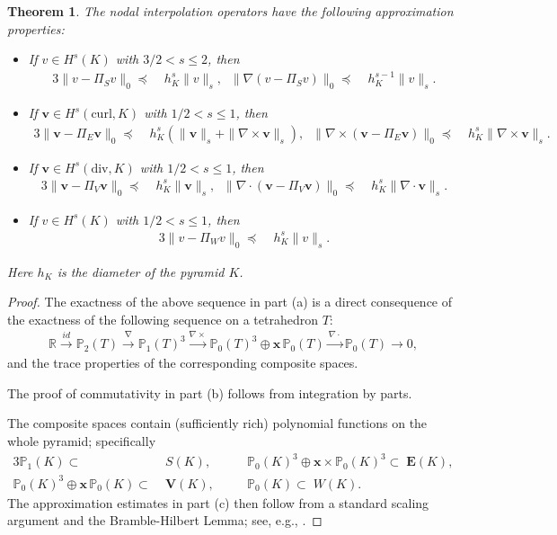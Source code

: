\documentclass[twoside,reqno,final]{amsart}
\newtheorem{theorem}{Theorem}
\renewcommand{\b}[1]{{\boldsymbol{#1}}}
\newcommand{\bR}{\mathbb R}
\newcommand{\curls}{{{\nabla\times}}}
\newcommand{\divs}{{\nabla\cdot}}
\newcommand{\grads}{{\nabla}}
\newcommand{\pol}{\mathbb{P}}
\begin{document}
\begin{theorem}
{\em  {}}
The nodal interpolation operators have the following approximation properties:
\begin{itemize}
 \item [(1)]
If $v\in H^s(K)$ with $3/2<s\le 2$, then
\begin{alignat*}{3}
 \|v-\varPi_S v\|_0\preceq &\; h_K^{s}\|v\|_s,
 \;\;
  \|\grads(v-\varPi_S v)\|_0\preceq &\; h_K^{s-1}\|v\|_s.
\end{alignat*}
 \item [(2)]
If $\b v\in H^s(\mathrm{curl},K)$ with $1/2<s\le 1$, then
\begin{alignat*}{3}
 \|\b v-\b\varPi_E \b v\|_0\preceq &\; h_K^{s}
 (\|\b v\|_s+\|\curls \b v\|_s), \;\; 
 \|\curls(\b v-\b\varPi_E \b v)\|_0\preceq &\; h_K^{s}
 \|\curls \b v\|_s.
\end{alignat*}
 \item [(3)]
If $\b v\in H^s(\mathrm{div},K)$ with $1/2<s\le 1$, then
\begin{alignat*}{3}
 \|\b v-\b\varPi_V \b v\|_0
\preceq &\; h_K^{s}
\|\b v\|_s, \;\;
 \|\divs(\b v-\b\varPi_V \b v)\|_0
\preceq &\; h_K^{s}
\|\divs\b v\|_s.
\end{alignat*}
 \item [(4)]
If $v\in H^s(K)$ with $1/2<s\le 1$, then
\begin{alignat*}{3}
 \|v-\varPi_W v\|_0
\preceq &\; h_K^{s}\|v\|_s.
\end{alignat*}
\end{itemize}
Here $h_K$ is the diameter of the pyramid $K$. 
\end{theorem}
\begin{proof}
 The exactness of the above sequence in part {\sf (a)} is  a direct consequence of the exactness of the following sequence on a tetrahedron $T$:
\begin{align*}
 \bR
\overset{id}{\longrightarrow}
\pol_2(T)
\overset{\grads}{\longrightarrow} 
\pol_1(T)^3
\overset{\curls}{\longrightarrow} 
\pol_0(T)^3\oplus \b x\,\pol_0(T)
\overset{\divs}{\longrightarrow} 
\pol_0(T)
\overset{}{\longrightarrow} 0,
\end{align*}
and the trace properties of the corresponding composite spaces.

The proof of commutativity in part {\sf(b)} follows from integration by parts.

The composite spaces contain (sufficiently rich) polynomial functions on the whole pyramid; specifically
\begin{alignat*}{3}
\pol_1(K)\subset&\; S(K),\quad  && 
\pol_0(K)^3\oplus \b x\times \pol_0(K)^3\subset\; \b E(K),\\
\pol_0(K)^3\oplus \b x\,\pol_0(K)\subset&\; \b V(K),
\quad&& \pol_0(K)\subset\; W(K).
\end{alignat*}
The approximation estimates in part {\sf (c)} then follow from a standard scaling argument and the Bramble-Hilbert Lemma;
see, e.g.,  \cite[Chapter 5]{Monk03}. 
\end{proof}
\end{document}
